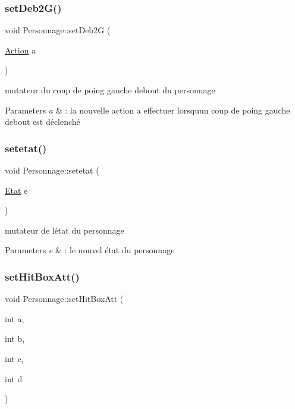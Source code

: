 \subsubsection{\texorpdfstring{set\+Deb2\+G()}{setDeb2G()}}
{\footnotesize\ttfamily void Personnage\+::set\+Deb2G (\begin{DoxyParamCaption}\item[{\hyperlink{class_action}{Action}}]{a }\end{DoxyParamCaption})}



mutateur du coup de poing gauche debout du personnage 


\begin{DoxyParams}{Parameters}
{\em a} & \+: la nouvelle action a effectuer lorsqu\textquotesingle{}un coup de poing gauche debout est déclenché \\
\hline
\end{DoxyParams}
\mbox{\label{class_personnage_af9197f8445b5daf12cee30a869e6ec30}} 
\subsubsection{\texorpdfstring{setetat()}{setetat()}}
{\footnotesize\ttfamily void Personnage\+::setetat (\begin{DoxyParamCaption}\item[{\hyperlink{class_etat}{Etat}}]{e }\end{DoxyParamCaption})}



mutateur de l\textquotesingle{}état du personnage 


\begin{DoxyParams}{Parameters}
{\em e} & \+: le nouvel état du personnage \\
\hline
\end{DoxyParams}
\mbox{\label{class_personnage_aba09ef09539b2b44de79cd5c0eb3139d}} 
\subsubsection{\texorpdfstring{set\+Hit\+Box\+Att()}{setHitBoxAtt()}}
{\footnotesize\ttfamily void Personnage\+::set\+Hit\+Box\+Att (\begin{DoxyParamCaption}\item[{int}]{a,  }\item[{int}]{b,  }\item[{int}]{c,  }\item[{int}]{d }\end{DoxyParamCaption})}



